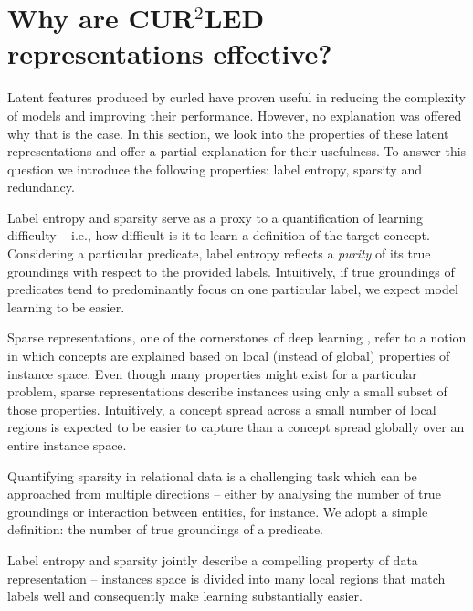 



\section{Why are CUR$^2$LED representations effective?}


Latent features produced by \gls{curled} have proven useful in reducing the complexity of models and improving their performance.
However, no explanation was offered why that is the case.
In this section, we look into the properties of these latent representations and offer a partial explanation for their usefulness.
To answer this question we introduce the following properties: label entropy, sparsity and redundancy.



Label entropy and sparsity serve as a proxy to a quantification of learning difficulty -- i.e., how difficult is it to learn a definition of the target concept.
Considering a particular predicate, label entropy reflects a \textit{purity} of its true groundings with respect to the provided labels.
Intuitively, if true groundings of predicates tend to predominantly focus on one particular label, we expect model learning to be easier.


Sparse representations, one of the cornerstones of deep learning \cite{Bengio2013RLR}, refer to a notion in which concepts are explained based on local (instead of global) properties of instance space.
Even though many properties might exist for a particular problem, sparse representations describe instances using only a small subset of those properties.
Intuitively, a concept spread across a small number of local regions is expected to be easier to capture than a concept spread globally over an entire instance space.



Quantifying sparsity in relational data is a challenging task which can be approached from multiple directions -- either by analysing the number of true groundings or interaction between entities, for instance.
We adopt a simple definition: the number of true groundings of a predicate.


Label entropy and sparsity jointly describe a compelling property of data representation --  instances space is divided into many local regions that match labels well  and consequently make learning substantially easier.



